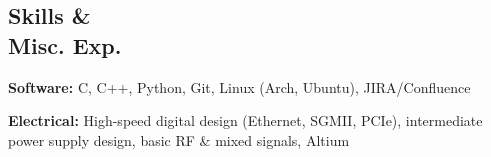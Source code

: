 \documentclass[10pt,letterpaper,margin]{res}
\begin{document}
\begin{resume}
\section{Skills \& \\ Misc. Exp.}

{\bf Software:} C, C++, Python, Git, Linux (Arch, Ubuntu), JIRA/Confluence

{\bf Electrical:} High-speed digital design (Ethernet, SGMII, PCIe),
intermediate power supply design, basic RF \& mixed signals, Altium


% 

\end{resume}



% 
% 
\end{document}
